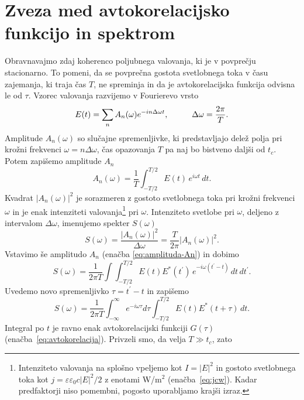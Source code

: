 \section{Zveza med avtokorelacijsko funkcijo in spektrom}

Obravnavajmo zdaj koherenco poljubnega valovanja, ki
je v povprečju stacionarno. To pomeni, da se povprečna gostota svetlobnega
toka v času zajemanja, ki traja čas $T$, ne spreminja in da je avtokorelacijska funkcija
odvisna le od $\tau$. Vzorec valovanja razvijemo
v Fourierevo vrsto
\begin{equation}
E(t)=\sum_{n}A_{n}(\omega)e^{-i n \Delta\omega t},\mbox{\hskip1cm}\Delta\omega=\frac{2\pi}{T}.
\end{equation}
Amplitude $A_{n}(\omega)$ so slučajne spremenljivke, ki predstavljajo delež polja pri 
krožni frekvenci $\omega=n\Delta\omega$, čas opazovanja $T$ pa naj bo bistveno daljši od $t_{c}$. 
Potem zapišemo amplitude $A_n$
\begin{equation}
A_{n}(\omega)=\frac{1}{T}\int_{-T/2}^{T/2}E(t)\, e^{i\omega t}\, dt.\label{eq:amplituda-An}
\end{equation}
Kvadrat $|A_{n}(\omega)|^{2}$ je sorazmeren z gostoto svetlobnega toka pri krožni
frekvenci $\omega$ in je enak intenziteti
valovanja\footnote{Intenziteto valovanja na splošno vpeljemo kot $I = |E|^2$ in gostoto svetlobnega
toka kot $j = \varepsilon \varepsilon_0 c |E|^2/2$ z enotami W/m$^2$ (enačba~\ref{eq:jcw}). 
Kadar predfaktorji niso pomembni, pogosto uporabljamo krajši izraz.}  pri $\omega$. 
Intenziteto svetlobe pri $\omega$, deljeno z intervalom $\Delta\omega$, imenujemo  
spekter $S(\omega)$
\begin{equation}
S(\omega)=\frac{|A_{n}(\omega)|^{2}}{\Delta\omega}=\frac{T}{2\pi}|A_{n}(\omega)|^{2}.
\end{equation}
Vstavimo še amplitudo $A_{n}$ (enačba \ref{eq:amplituda-An}) in dobimo 
\begin{equation}
S(\omega) =\frac{1}{2\pi T}\int\int_{-T/2}^{T/2}E(t)E^{*}(t^{\prime})\, 
e^{-i\omega(t^{\prime}-t)}\, dt\, dt^{\prime}.
\end{equation}
Uvedemo novo spremenljivko $\tau=t^{\prime}-t$ in zapišemo
\begin{equation}
S(\omega)=\frac{1}{2\pi T}\int_{-\infty}^{\infty}e^{-i\omega\tau}d\tau\int_{-T/2}^{T/2}E(t)E^{*}(t+\tau)\, dt.
\label{eq:spekter}
\end{equation}
Integral po $t$ je ravno enak avtokorelacijski funkciji $G(\tau)$ 
(enačba~\ref{eq:avtokorelacija}). Privzeli smo, da velja $T\gg t_{c}$, zato 
